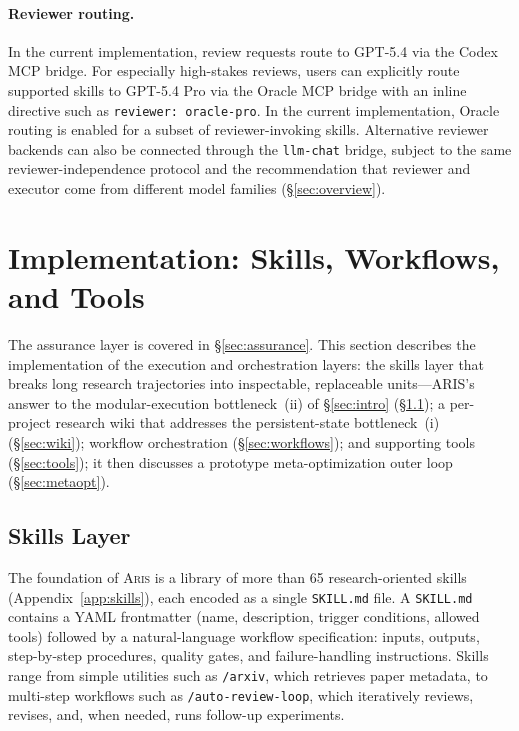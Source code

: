 \documentclass{article}
\newcommand{\aris}{\textsc{Aris}}
\newcommand{\skillmd}{\texttt{SKILL.md}}
\theoremstyle{remark}
\begin{document}
\paragraph{Reviewer routing.}
In the current implementation, review requests route to GPT-5.4 via the Codex MCP bridge.
For especially high-stakes reviews, users can explicitly route supported skills to GPT-5.4 Pro via the Oracle MCP bridge with an inline directive such as \texttt{reviewer: oracle-pro}.
In the current implementation, Oracle routing is enabled for a subset of reviewer-invoking skills.
Alternative reviewer backends can also be connected through the \texttt{llm-chat} bridge, subject to the same reviewer-independence protocol and the recommendation that reviewer and executor come from different model families (\S\ref{sec:overview}).

\section{Implementation: Skills, Workflows, and Tools}
\label{sec:realization}


The assurance layer is covered in \S\ref{sec:assurance}.
This section describes the implementation of the execution and orchestration layers: the skills layer that breaks long research trajectories into inspectable, replaceable units---ARIS's answer to the modular-execution bottleneck~(ii) of \S\ref{sec:intro} (\S\ref{sec:skills}); a per-project research wiki that addresses the persistent-state bottleneck~(i) (\S\ref{sec:wiki}); workflow orchestration (\S\ref{sec:workflows}); and supporting tools (\S\ref{sec:tools}); it then discusses a prototype meta-optimization outer loop (\S\ref{sec:metaopt}).

\subsection{Skills Layer}
\label{sec:skills}

The foundation of \aris{} is a library of more than 65 research-oriented skills (Appendix~\ref{app:skills}), each encoded as a single \skillmd{} file.
A \skillmd{} contains a YAML frontmatter (name, description, trigger conditions, allowed tools) followed by a natural-language workflow specification: inputs, outputs, step-by-step procedures, quality gates, and failure-handling instructions.
Skills range from simple utilities such as \texttt{/arxiv}, which retrieves paper metadata, to multi-step workflows such as \texttt{/auto-review-loop}, which iteratively reviews, revises, and, when needed, runs follow-up experiments.
\end{document}
